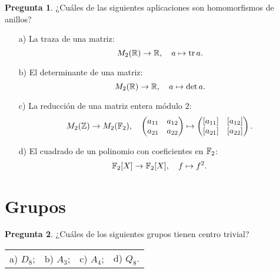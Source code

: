 \documentclass{article}
\theoremstyle{definition}
\newtheorem{pregunta}{Pregunta}
\begin{document}
\begin{pregunta}
  ¿Cuáles de las siguientes aplicaciones son homomorfismos de anillos?

  \begin{enumerate}
  \item[a)] La traza de una matriz:
    $$M_2 (\mathbb{R}) \to \mathbb{R}, \quad a \mapsto \operatorname{tr} a.$$

  \item[b)] El determinante de una matriz:
    $$M_2 (\mathbb{R}) \to \mathbb{R}, \quad a \mapsto \det a.$$

  \item[c)] La reducción de una matriz entera módulo $2$:
    \[ M_2 (\mathbb{Z}) \to M_2 (\mathbb{F}_2), \quad
      \begin{pmatrix} a_{11} & a_{12} \\ a_{21} & a_{22} \end{pmatrix} \mapsto
      \begin{pmatrix} [a_{11}] & [a_{12}] \\ [a_{21}] & [a_{22}] \end{pmatrix}. \]

  \item[d)] El cuadrado de un polinomio con coeficientes en $\mathbb{F}_2$:
    $$\mathbb{F}_2 [X] \to \mathbb{F}_2 [X], \quad f \mapsto f^2.$$
  \end{enumerate}
\end{pregunta}

\pagebreak

\section*{Grupos}


\begin{pregunta}
  ¿Cuáles de los siguientes grupos tienen centro trivial?

  \begin{center}
    \begin{tabular}{x{3cm}x{3cm}x{3cm}x{3cm}}
      a) $D_8$; & b) $A_3$; & c) $A_4$; & d) $Q_8$.
    \end{tabular}
  \end{center}
\end{pregunta}

\vspace{3em}
\end{document}
